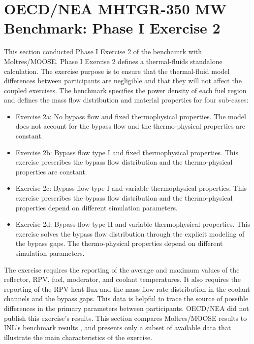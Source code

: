 
\section{OECD/NEA MHTGR-350 MW Benchmark: Phase I Exercise 2}

This section conducted Phase I Exercise 2 of the benchamrk with Moltres/MOOSE.
Phase I Exercise 2 defines a thermal-fluids standalone calculation.
The exercise purpose is to ensure that the thermal-fluid model differences between participants are negligible and that they will not affect the coupled exercises.
The benchmark specifies the power density of each fuel region and defines the mass flow distribution and material properties for four sub-cases:
\begin{itemize}
  \item Exercise 2a: No bypass flow and fixed thermophysical properties. The model does not account for the bypass flow and the thermo-physical properties are constant.
  \item Exercise 2b: Bypass flow type I and fixed thermophysical properties. This exercise prescribes the bypass flow distribution and the thermo-physical properties are constant.
  \item Exercise 2c: Bypass flow type I and variable thermophysical properties. This exercise prescribes the bypass flow distribution and the thermo-physical properties depend on different simulation parameters.
  \item Exercise 2d: Bypass flow type II and variable thermophysical properties. This exercise solves the bypass flow distribution through the explicit modeling of the bypass gaps. The thermo-physical properties depend on different simulation parameters.
\end{itemize}

The exercise requires the reporting of the average and maximum values of the reflector, \gls{RPV}, fuel, moderator, and coolant temperatures.
It also requires the reporting of the RPV heat flux and the mass flow rate distribution in the coolant channels and the bypass gaps.
This data is helpful to trace the source of possible differences in the primary parameters between participants.
OECD/NEA did not publish this exercise's results.
This section compares Moltres/MOOSE results to INL's benchmark results \cite{strydom_inl_2013}, and presents only a subset of available data that illustrate the main characteristics of the exercise.



